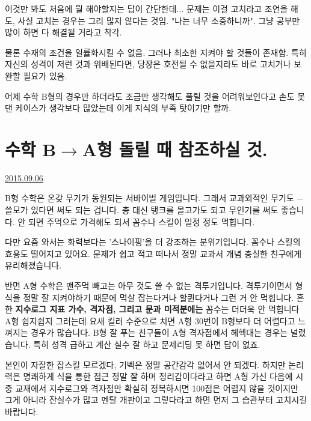 이것만 봐도 처음에 뭘 해야할지는 답이 간단한데...
문제는 이걸 고치라고 조언을 해도, 사실 고치는 경우는 그리 많지 않다는 것임.
"나는 너무 소중하니까".
그냥 공부만 많이 하면 다 해결될 거라고 착각.
\vspace{5mm}

물론 수재의 조건을 일률화시킬 수 없음. 그러나 최소한 지켜야 할 것들이 존재함.
특히 자신의 성격이 저런 것과 위배된다면, 당장은 호전될 수 없을지라도 바로 고치거나 보완할 필요가 있음.
\vspace{5mm}

어제 수학 B형의 경우만 하더라도 조금만 생각해도 풀릴 것을 어려워보인다고 손도 못 댄 케이스가 생각보다 많았는데
이게 지식의 부족 탓이기만 할까.
\vspace{5mm}








\section{수학 B$\rightarrow$A형 돌릴 때 참조하실 것.}
\href{https://www.kockoc.com/Apoc/296976}{2015.09.06}

\vspace{5mm}

B형 수학은 온갖 무기가 동원되는 서바이벌 게임입니다.
그래서 교과외적인 무기도 $-$ 쓸모가 있다면 써도 되는 겁니다.
총 대신 탱크를 몰고가도 되고 무인기를 써도 좋습니다. 안 되면 주먹으로 가격해도 되서 꼼수나 스킬이 일정 정도 먹힙니다.
\vspace{5mm}

다만 요즘 와서는 화력보다는 '스나이핑'을 더 강조하는 분위기입니다.
꼼수나 스킬의 효용도 떨어지고 있어요. 문제가 쉽고 적고 떠나서 정말 교과서 개념 충실한 친구에게 유리해졌습니다.
\vspace{5mm}

반면 A형 수학은 맨주먹 빼고는 아무 것도 쓸 수 없는 격투기입니다.
격투기이면서 형식을 정말 잘 지켜야하기 때문에 멱살 잡는다거나 할퀸다거나 그런 거 안 먹힙니다.
흔한 \textbf{지수로그 지표 가수, 격자점, 그리고 문과 미적분에는} 꼼수는 더더욱 안 먹힙니다
A형 쉽지쉽지 그러는데 요새 킬러 수준으로 치면 A형 30번이 B형보다 더 어렵다고 느껴지는 경우가 많습니다.
B형 잘 푸는 친구들이 A형 격자점에서 헤헥대는 경우는 널렸습니다. 특히 성격 급하고 계산 실수 잘 하고 문제리딩 못 하면 답이 없죠.
\vspace{5mm}

본인이 자잘한 잡스킬 모르겠다, 기벡은 정말 공간감각 없어서 안 되겠다.
하지만 논리력은 명쾌하게 식을 통한 접근 정말 잘 하며 정리갑이다라고 하면 A형 가신 다음에
시중 교재에서 지수로그와 격자점만 확실히 정복하시면 100점은 어렵지 않을 것이지만
그게 아니라 잔실수가 많고 멘탈 개판이고 그렇다라고 하면 먼저 그 습관부터 고치시길 바랍니다.
\vspace{5mm}

